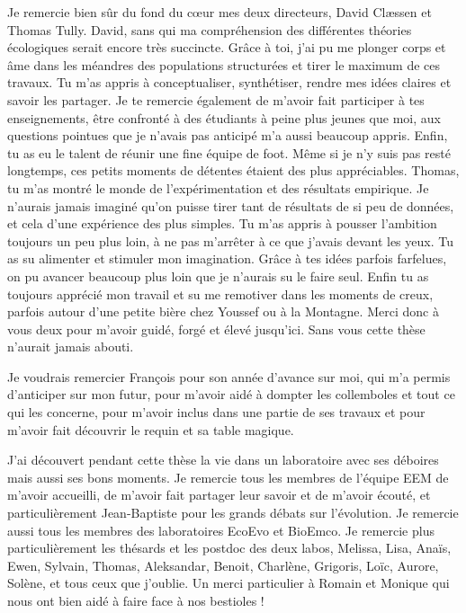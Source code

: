 Je remercie bien sûr du fond du cœur mes deux directeurs, David Clæssen et
Thomas Tully. David, sans qui ma compréhension des différentes théories
écologiques serait encore très succincte. Grâce à toi, j’ai pu me plonger corps
et âme dans les méandres des populations structurées et tirer le maximum de ces
travaux. Tu m’as appris à conceptualiser, synthétiser, rendre mes idées claires
et savoir les partager. Je te remercie également de m’avoir fait participer à
tes enseignements, être confronté à des étudiants à peine plus jeunes que moi,
aux questions pointues que je n’avais pas anticipé m’a aussi beaucoup appris.
Enfin, tu as eu le talent de réunir une fine équipe de foot. Même si je n’y suis
pas resté longtemps, ces petits moments de détentes étaient des plus
appréciables. Thomas, tu m’as montré le monde de l’expérimentation et des
résultats empirique. Je n’aurais jamais imaginé qu’on puisse tirer tant de
résultats de si peu de données, et cela d’une expérience des plus simples. Tu
m’as appris à pousser l’ambition toujours un peu plus loin, à ne pas m’arrêter à
ce que j’avais devant les yeux. Tu as su alimenter et stimuler mon imagination.
Grâce à tes idées parfois farfelues, on pu avancer beaucoup plus loin que je
n’aurais su le faire seul. Enfin tu as toujours apprécié mon travail et su me
remotiver dans les moments de creux, parfois autour d’une petite bière chez
Youssef ou à la Montagne. Merci donc à vous deux pour m’avoir guidé, forgé et
élevé jusqu’ici. Sans vous cette thèse n’aurait jamais abouti.

Je voudrais remercier François pour son année d’avance sur moi, qui m’a permis
d’anticiper sur mon futur, pour m’avoir aidé à dompter les collemboles et tout
ce qui les concerne, pour m’avoir inclus dans une partie de ses travaux et pour
m’avoir fait découvrir le requin et sa table magique.

J’ai découvert pendant cette thèse la vie dans un laboratoire avec ses déboires
mais aussi ses bons moments. Je remercie tous les membres de l’équipe EEM de
m’avoir accueilli, de m’avoir fait partager leur savoir et de m’avoir écouté, et
particulièrement Jean-Baptiste pour les grands débats sur l’évolution. Je
remercie aussi tous les membres des laboratoires EcoEvo et BioEmco. Je remercie
plus particulièrement les thésards et les postdoc des deux labos, Melissa, Lisa,
Anaïs, Ewen, Sylvain, Thomas, Aleksandar, Benoit, Charlène, Grigoris, Loïc,
Aurore, Solène, et tous ceux que j’oublie. Un merci particulier à Romain et
Monique qui nous ont bien aidé à faire face à nos bestioles !

